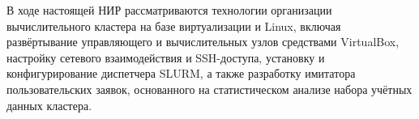 В ходе настоящей НИР рассматриваются технологии организации
вычислительного кластера на базе виртуализации и Linux, включая
развёртывание управляющего и вычислительных узлов средствами
VirtualBox, настройку сетевого взаимодействия и SSH-доступа,
установку и конфигурирование диспетчера SLURM, а также разработку
имитатора пользовательских заявок, основанного на статистическом
анализе набора учётных данных кластера.